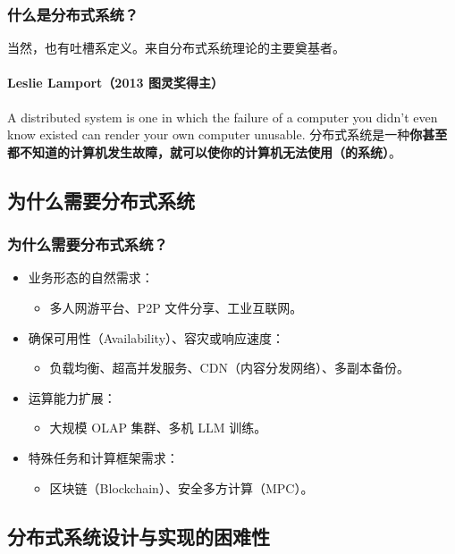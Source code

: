 \documentclass[UTF8,a4paper,11pt]{ctexart}
\begin{document}
\subsubsection*{什么是分布式系统？}

当然，也有吐槽系定义。来自分布式系统理论的主要奠基者。

\paragraph{Leslie Lamport（2013 图灵奖得主）}
A distributed system is one in which the failure of a computer you didn't even know existed can render your own computer unusable.
分布式系统是一种\textbf{你甚至都不知道的计算机发生故障，就可以使你的计算机无法使用（的系统）}。

\subsection{为什么需要分布式系统}

\subsubsection*{为什么需要分布式系统？}

\begin{itemize}
  \item 业务形态的自然需求：
  \begin{itemize}
    \item 多人网游平台、P2P 文件分享、工业互联网。
  \end{itemize}
  \item 确保可用性（Availability）、容灾或响应速度：
  \begin{itemize}
    \item 负载均衡、超高并发服务、CDN（内容分发网络）、多副本备份。
  \end{itemize}
  \item 运算能力扩展：
  \begin{itemize}
    \item 大规模 OLAP 集群、多机 LLM 训练。
  \end{itemize}
  \item 特殊任务和计算框架需求：
  \begin{itemize}
    \item 区块链（Blockchain）、安全多方计算（MPC）。
  \end{itemize}
\end{itemize}

\subsection{分布式系统设计与实现的困难性}
\end{document}

